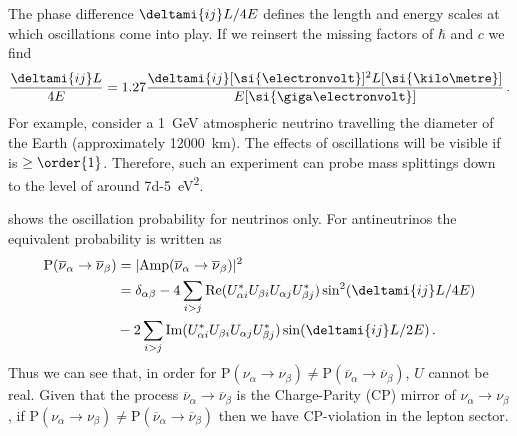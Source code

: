 The phase difference $\deltami{ij}L/4E$ defines the length and energy scales at which oscillations come into play.
If we reinsert the missing factors of $\hbar$ and $c$ we find
\begin{equation}
  \frac{ \deltami{ij} L }{ 4E } = 1.27 \frac{ \deltami{ij} [\si{\electronvolt}]^{2} L [\si{\kilo\metre}]}{ E [\si{\giga\electronvolt}] } \, .
  \label{eq:phaseDiffM2}
\end{equation}
For example, consider a \SI{1}{\giga\electronvolt} atmospheric neutrino travelling the diameter of the Earth (approximately \SI{12000}{\kilo\metre}).
The effects of oscillations will be visible if  is $\geq \order{1}$.
Therefore, such an experiment can probe mass splittings down to the level of around \SI{7d-5}{\electronvolt\squared}.

 shows the oscillation probability for neutrinos only.
For antineutrinos the equivalent probability is written as
\begin{align}
\begin{split}
  \text{P}(\overline{\nu}_{\alpha} \rightarrow \overline{\nu}_{\beta}) &= | \text{Amp}(\overline{\nu}_{\alpha} \rightarrow \overline{\nu}_{\beta}) |^{2} \\
  &= \delta_{\alpha \beta} - 4 \sum_{i > j} \text{Re}( U^{*}_{\alpha i} U_{\beta i} U_{\alpha j} U^{*}_{\beta j} ) \sin^{2}(\deltami{ij}L/4E) \\
  & - 2 \sum_{i>j} \text{Im}( U^{*}_{\alpha i} U_{\beta i} U_{\alpha j} U^{*}_{\beta j} ) \sin (\deltami{ij}L/2E) \, .
\end{split}
\end{align}
Thus we can see that, in order for $\text{P}(\nu_{\alpha} \rightarrow \nu_{\beta}) \neq \text{P}(\overline{\nu}_{\alpha} \rightarrow \overline{\nu}_{\beta})$, $U$ cannot be real.
Given that the process $\overline{\nu}_{\alpha} \rightarrow \overline{\nu}_{\beta}$ is the Charge-Parity (CP) mirror of $\nu_{\alpha} \rightarrow \nu_{\beta}$, if $\text{P}(\nu_{\alpha} \rightarrow \nu_{\beta}) \neq \text{P}(\overline{\nu}_{\alpha} \rightarrow \overline{\nu}_{\beta})$ then we have CP-violation in the lepton sector.

